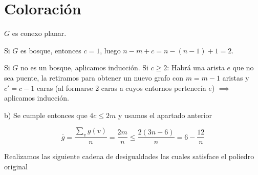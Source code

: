\documentclass[openany]{book}
\begin{document}
\chapter{Coloración}


\begin{demonstration}
    $ G $ es conexo planar.
    
    Si $ G $ es bosque, entonces $ c = 1 $, luego $ n-m+c = n-(n-1)+1=2 $.
    
    Si $ G $ no es un bosque, aplicamos inducción. Si $ c\geq 2 $:
    Habrá una arista $ e $ que no sea puente, la retiramos para obtener un nuevo grafo con $ m = m-1 $ aristas y $ c' = c-1 $ caras (al formarse 2 caras a cuyos entornos pertenecía $ e $) $ \implies $ aplicamos inducción.

\end{demonstration}



    b) Se cumple entonces que $ 4c \leq 2m $ y usamos el apartado anterior %




\begin{demonstration}
    $$ \overline{g} = \dfrac{\sum\limits_{v}^{}g(v)}{n} = \dfrac{2m}{n} \leq \dfrac{2(3n-6)}{n} = 6-\dfrac{12}{n} $$
\end{demonstration}








Realizamos las siguiente cadena de desigualdades las cuales satisface el poliedro original
\end{document}
